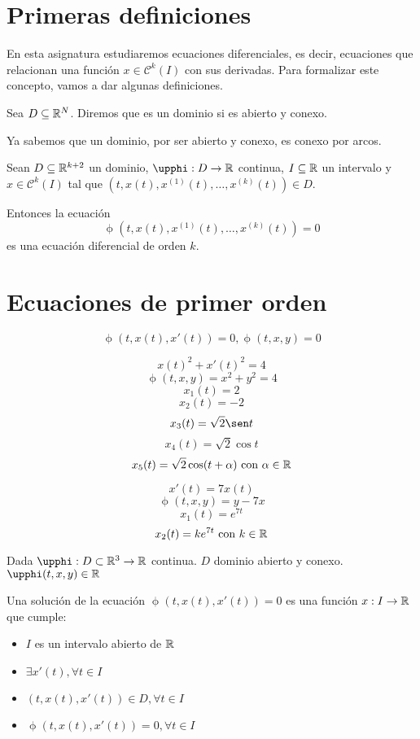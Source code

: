 
\section{Primeras definiciones}

En esta asignatura estudiaremos ecuaciones diferenciales, es decir, ecuaciones que relacionan una función $x \in \mathcal{C}^k(I)$
con sus derivadas. Para formalizar este concepto, vamos a dar algunas definiciones.

\begin{ndef}[Dominio]
  Sea $D \subseteq \mathbb{R}^N$. Diremos que es un dominio si es abierto y conexo.
\end{ndef}

Ya sabemos que un dominio, por ser abierto y conexo, es conexo por arcos.

\begin{ndef}
  Sean $D \subseteq \mathbb{R}^{k+2}$ un dominio, $\upphi : D \to \R$ continua, $I \subseteq \mathbb{R}$ un intervalo y $x \in \mathcal{C}^k(I)$
  tal que $(t, x(t), x^{(1)}(t), \dots, x^{(k)}(t)) \in D$.

  Entonces la ecuación
  \[\upphi(t, x(t), x^{(1)}(t), \dots, x^{(k)}(t)) = 0\]
  es una ecuación diferencial de orden $k$.
\end{ndef}

\section{Ecuaciones de primer orden}
\[ \upphi(t, x(t), x'(t)) = 0,   \upphi(t,x,y) = 0  \]

\begin{ejemplo}
\[x(t)^2 + x'(t)^2 = 4 \]
\[ \upphi(t,x,y) = x^2+y^2 = 4\]
\[ x_1(t) = 2 \]
\[ x_2(t) = -2 \]
\[ x_3(t) = \sqrt{2}\sen t \]
\[ x_4(t) = \sqrt{2}\cos t \]
\[ x_5(t) = \sqrt{2}\cos(t+\alpha) \text{ con } \alpha\in\mathbb{R} \]
\end{ejemplo}

\begin{ejemplo}

\[ x'(t) = 7x(t) \]
\[ \upphi(t,x,y) = y - 7x \]
\[ x_1(t) = e^{7t} \]
\[ x_2(t) = ke^{7t} \text{ con } k \in \mathbb{R} \] 


\end{ejemplo}

Dada $\upphi: D\subset\R^3\to\R$ continua.
$D$ dominio abierto y conexo.
$\upphi(t,x,y)\in\R$

\begin{ndef}

Una solución de la ecuación $\upphi(t, x(t), x'(t)) = 0$ es una función $x:I\to\mathbb{R}$ que cumple:
\begin{itemize}
\item $I$ es un intervalo abierto de $\mathbb{R}$
\item $\exists x'(t), \forall t \in I$
\item $(t, x(t), x'(t)) \in D, \forall t \in I$
\item $\upphi(t,x(t),x'(t)) = 0, \forall t \in I$
\end{itemize}

\end{ndef}


